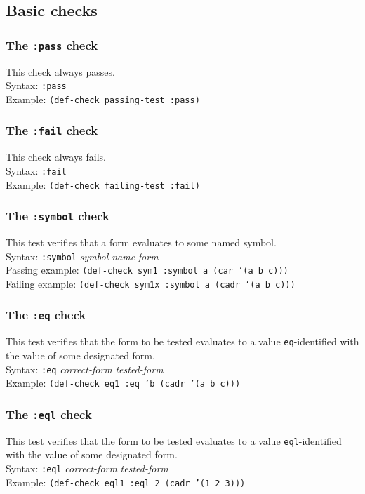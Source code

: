 \documentclass{article}
\begin{document}
\subsection{Basic checks}
\subsubsection{The \texttt{:pass} check} 
This check always passes.
\\ Syntax: \texttt{:pass}
\\ Example: \texttt{(def-check passing-test :pass)}

\subsubsection{The \texttt{:fail} check} 
This check always fails.
\\ Syntax: \texttt{:fail}
\\ Example: \texttt{(def-check failing-test :fail)}

\subsubsection{The \texttt{:symbol} check} 
This test verifies that a form evaluates to some named
symbol.
\\ Syntax: \texttt{:symbol} \textit{symbol-name} \textit{form}
\\ Passing example: \texttt{(def-check sym1 :symbol a (car '(a b c)))}
\\ Failing example: \texttt{(def-check sym1x :symbol a (cadr '(a b c)))}

\subsubsection{The \texttt{:eq} check} 
This test verifies that the form to be tested evaluates to a value
\texttt{eq}-identified with the value of some designated
form.
\\ Syntax: \texttt{:eq} \textit{correct-form} \textit{tested-form}
\\ Example: \texttt{(def-check eq1 :eq 'b (cadr '(a b c)))}

\subsubsection{The \texttt{:eql} check} 
This test verifies that the form to be tested evaluates to a value
\texttt{eql}-identified with the value of some designated
form.
\\ Syntax: \texttt{:eql} \textit{correct-form} \textit{tested-form}
\\ Example: \texttt{(def-check eql1 :eql 2 (cadr '(1 2 3)))}
\end{document}
